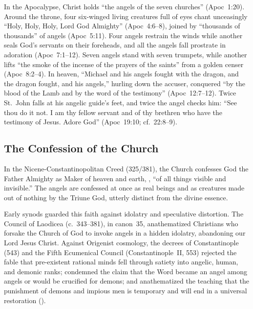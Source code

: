 In the Apocalypse, Christ holds ``the angels of the seven churches'' (Apoc~1:20). Around the throne, four six-winged living creatures full of eyes chant unceasingly ``Holy, Holy, Holy, Lord God Almighty'' (Apoc~4:6--8), joined by ``thousands of thousands'' of angels (Apoc~5:11). Four angels restrain the winds while another seals God's servants on their foreheads, and all the angels fall prostrate in adoration (Apoc~7:1--12). Seven angels stand with seven trumpets, while another lifts ``the smoke of the incense of the prayers of the saints'' from a golden censer (Apoc~8:2--4). In heaven, ``Michael and his angels fought with the dragon, and the dragon fought, and his angels,'' hurling down the accuser, conquered ``by the blood of the Lamb and by the word of the testimony'' (Apoc~12:7--12). Twice St.~John falls at his angelic guide's feet, and twice the angel checks him: ``See thou do it not. I am thy fellow servant and of thy brethren who have the testimony of Jesus. Adore God'' (Apoc~19:10; cf.~22:8--9).

\subsection{The Confession of the Church}
\label{subsec:church-confession}

In the Nicene-Constantinopolitan Creed (325/381), the Church confesses God the Father Almighty as Maker of heaven and earth, , ``of all things visible and invisible.'' The angels are confessed at once as real beings and as creatures made out of nothing by the Triune God, utterly distinct from the divine essence.

Early synods guarded this faith against idolatry and speculative distortion. The Council of Laodicea (c.~343--381), in canon~35, anathematized Christians who forsake the Church of God to invoke angels in a hidden idolatry, abandoning our Lord Jesus Christ. Against Origenist cosmology, the decrees of Constantinople (543) and the Fifth Ecumenical Council (Constantinople~II, 553) rejected the fable that pre-existent rational minds fell through satiety into angelic, human, and demonic ranks; condemned the claim that the Word became an angel among angels or would be crucified for demons; and anathematized the teaching that the punishment of demons and impious men is temporary and will end in a universal restoration ().

